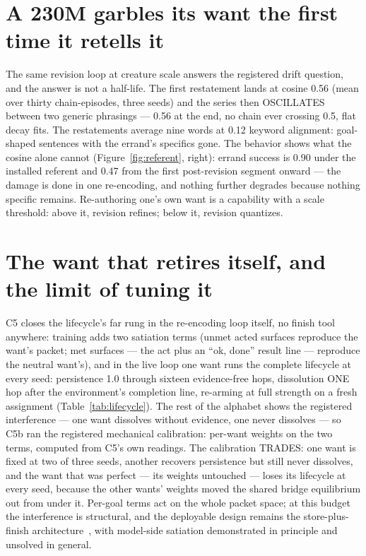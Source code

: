 \documentclass[11pt]{article}
\begin{document}
\section{A 230M garbles its want the first time it retells it}

The same revision loop at creature scale answers the registered
drift question, and the answer is not a half-life. The first
restatement lands at cosine 0.56 (mean over thirty
chain-episodes, three seeds) and the series then OSCILLATES between
two generic phrasings --- 0.56 at the end, no chain ever
crossing 0.5, flat decay fits. The restatements average nine words at
0.12 keyword alignment: goal-shaped sentences with the errand's
specifics gone. The behavior shows what the cosine alone cannot
(Figure~\ref{fig:referent}, right): errand success is
0.90 under the installed referent and 0.47
from the first post-revision segment onward --- the damage is done in
one re-encoding, and nothing further degrades because nothing
specific remains. Re-authoring one's own want is a capability with a
scale threshold: above it, revision refines; below it, revision
quantizes.

\section{The want that retires itself, and the limit of tuning it}

C5 closes the lifecycle's far rung in the re-encoding loop itself, no
finish tool anywhere: training adds two satiation terms (unmet acted
surfaces reproduce the want's packet; met surfaces --- the act plus an
``ok, done'' result line --- reproduce the neutral want's), and in the
live loop one want runs the complete lifecycle at every seed:
persistence 1.0 through sixteen evidence-free hops, dissolution ONE
hop after the environment's completion line, re-arming at full
strength on a fresh assignment (Table~\ref{tab:lifecycle}). The rest
of the alphabet shows the registered interference --- one want
dissolves without evidence, one never dissolves --- so C5b ran the
registered mechanical calibration: per-want weights on the two terms,
computed from C5's own readings. The calibration TRADES: one want is
fixed at two of three seeds, another recovers persistence but still
never dissolves, and the want that was perfect --- its weights
untouched --- loses its lifecycle at every seed, because the other
wants' weights moved the shared bridge equilibrium out from under it.
Per-goal terms act on the whole packet space; at this budget the
interference is structural, and the deployable design remains the
store-plus-finish architecture~\cite{penov2026act}, with
model-side satiation demonstrated in principle and unsolved in
general.
\end{document}
